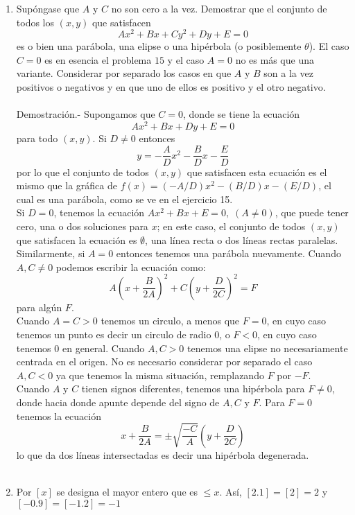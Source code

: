 \begin{enumerate}[\bfseries 1.]
    \item Supóngase que $A$ y $C$ no son cero a la vez. Demostrar que el conjunto de todos los $(x,y)$ que satisfacen $$Ax^2 + Bx + Cy^2 +Dy + E = 0$$ es o bien una parábola, una elipse o una hipérbola (o posiblemente $\theta$). El caso $C=0$ es en esencia el problema $15$ y el caso $A=0$ no es más que una variante. Considerar por separado los casos en que $A$ y $B$ son a la vez positivos o negativos y en que uno de ellos es positivo y el otro negativo.\\\\
	Demostración.-\; Supongamos que $C=0$,  donde se tiene la ecuación $$Ax^2 + Bx + Dy + E = 0$$ para todo $(x,y).$ Si $D\neq 0$ entonces $$y=-\dfrac{A}{D}x^2 - \dfrac{B}{D}x -\dfrac{E}{D}$$ por lo que el conjunto de todos $(x, y)$ que satisfacen esta ecuación es el mismo que la gráfica de $f(x)=(-A/D)x^2 - (B/D)x -(E/D)$, el cual es una parábola, como se ve en el ejercicio 15.\\
	Si $D=0$, tenemos la ecuación $Ax^2+Bx+E=0, \; (A\neq 0)$, que puede tener cero, una o dos soluciones para $x$; en este caso, el conjunto de todos $(x, y)$ que satisfacen la ecuación es $\emptyset$, una línea recta o dos líneas rectas paralelas. Similarmente, si $A=0$ entonces tenemos una parábola nuevamente.  Cuando $A,C\neq 0$ podemos escribir la ecuación como: $$A\left(x + \dfrac{B}{2A}\right)^2 + C\left( y + \dfrac{D}{2C} \right)^2=F$$ para algún $F$.\\
	Cuando $A=C > 0$ tenemos un circulo, a menos que $F=0$, en cuyo caso tenemos un punto es decir un circulo de radio $0$, o $F<0$, en cuyo caso tenemos $0$ en general. Cuando $A,C>0$ tenemos una elipse no necesariamente centrada en el origen. No es necesario considerar por separado el caso $A,C<0$ ya que tenemos la misma situación, remplazando $F$ por $-F$.\\
	Cuando $A$ y $C$ tienen signos diferentes, tenemos una hipérbola para $F \neq 0$, donde hacia donde apunte depende del signo de $A,C$ y $F$. Para $F=0$ tenemos la ecuación $$x+\dfrac{B}{2A} = \pm \sqrt{\dfrac{-C}{A}}\left(y + \dfrac{D}{2C}\right)$$ lo que da dos líneas intersectadas es decir una hipérbola degenerada.\\\\

    \item Por $[x]$ se designa el mayor entero que es $\leq x$. Así, $[2.1]=[2]=2$ y $[-0.9]=[-1.2]=-1$
    \begin{enumerate}[\bfseries (i)]
	

\end{enumerate}
\end{enumerate}
